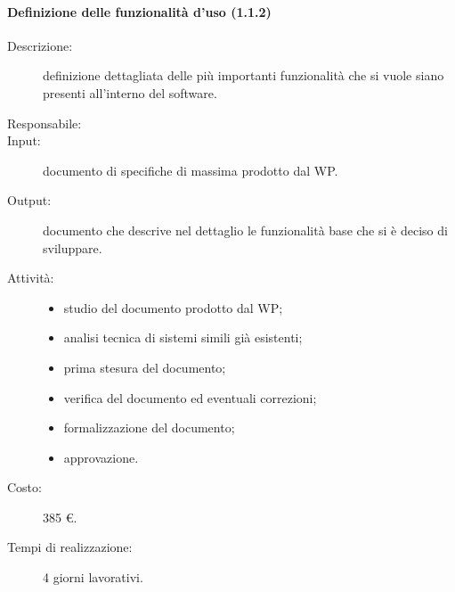 \paragraph{Definizione delle funzionalit\`{a} d'uso (1.1.2)}
\begin{description}
\item[Descrizione:] definizione dettagliata delle pi\`{u} importanti funzionalit\`{a} che si vuole siano presenti all'interno del software.
\item[Responsabile:]
\item[Input:] documento di specifiche di massima prodotto dal WP.
\item[Output:] documento che descrive nel dettaglio le funzionalit\`{a} base che si \`{e} deciso di sviluppare.
\item[Attivit\`{a}:]
\begin{center}
\begin{itemize}
\item studio del documento prodotto dal WP;
\item analisi tecnica di sistemi simili gi\`{a} esistenti;
\item prima stesura del documento;
\item verifica del documento ed eventuali correzioni;
\item formalizzazione del documento;
\item approvazione.
\end{itemize}
\end{center}
\item[Costo:] 385 \euro{}.
\item[Tempi di realizzazione:] 4 giorni lavorativi.
\end{description}

